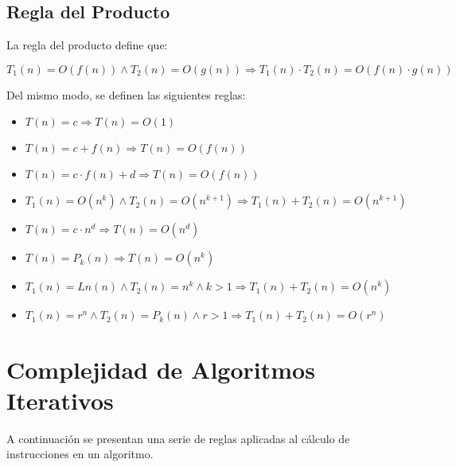 \subsection{Regla del Producto}

La regla del producto define que:

$T_1(n) = O(f(n)) \wedge T_2(n) = O(g(n)) \Rightarrow T_1(n) \cdot T_2(n) = O(f(n) \cdot g(n))$

Del mismo modo, se definen las siguientes reglas:
\begin{itemize}
\item $T(n) = c \Rightarrow T(n) = O(1)$
\item $T(n) = c + f(n) \Rightarrow T(n) = O(f(n))$
\item $T(n) = c \cdot f(n) + d \Rightarrow T(n) = O(f(n))$
\item $T_1(n) = O(n^k) \wedge T_2(n) = O(n^{k+1}) \Rightarrow T_1(n) + T_2(n) = O(n^{k+1})$
\item $T(n) = c \cdot n^d \Rightarrow T(n) = O(n^d)$
\item $T(n) = P_k(n) \Rightarrow T(n) = O(n^k)$
\item $T_1(n) = Ln(n) \wedge T_2(n) = n^k \wedge k > 1 \Rightarrow T_1(n) + T_2(n) = O(n^k)$
\item $T_1(n) = r^n \wedge T_2(n) = P_k(n) \wedge r > 1 \Rightarrow T_1(n) + T_2(n) = O(r^n)$
\end{itemize}

\section{Complejidad de Algoritmos Iterativos} \label{lb:seccomp}

A continuación se presentan una serie de reglas aplicadas al cálculo de instrucciones en un algoritmo.

